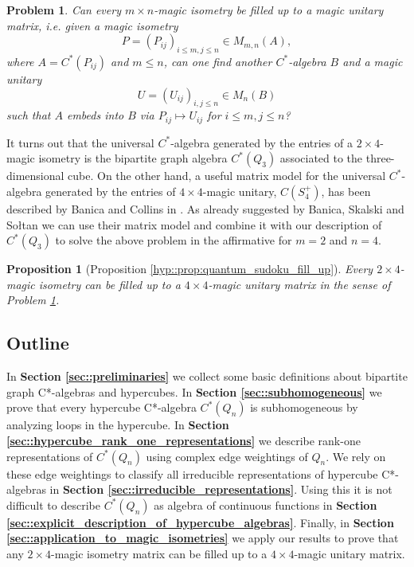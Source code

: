 \documentclass[a4paper]{amsart}
\newtheorem{problem}[thm]{Problem}
\newtheorem{introprop}[introthm]{Proposition}
\begin{document}
\begin{problem}
    \label{intro::problem:magic_isometry_fill_up}
    Can every $m \times n$-magic isometry be filled up to a magic unitary matrix, i.e. given a magic isometry 
    $$
    P = (P_{ij})_{i \leq m, j \leq n} \in M_{m,n}(A),
    $$ 
    where $A = C^\ast(P_{ij})$ and $m \leq n$, can one find another $C^\ast$-algebra $B$ and a magic unitary 
    $$
    U = (U_{ij})_{i,j \leq n} \in M_n(B)
    $$ 
    such that $A$ embeds into $B$ via $P_{ij} \mapsto U_{ij}$ for $i \leq m, j \leq n$?
\end{problem}

It turns out that the universal $C^\ast$-algebra generated by the entries of a $2 \times 4$-magic isometry is the bipartite graph algebra $C^\ast(Q_3)$ associated to the three-dimensional cube. On the other hand, a useful matrix model for the universal $C^\ast$-algebra generated by the entries of  $4 \times 4$-magic unitary, $C(S_4^+)$, has been described by Banica and Collins in \cite{banica_integration_2008}. As already suggested by Banica, Skalski and So\l tan we can use their matrix model and combine it with our description of $C^\ast(Q_3)$ to solve the above problem in the affirmative for $m=2$ and $n=4$.

\begin{introprop}[Proposition \ref{hyp::prop:quantum_sudoku_fill_up}]
    Every $2 \times 4$-magic isometry can be filled up to a $4 \times 4$-magic unitary matrix in the sense of Problem \ref{intro::problem:magic_isometry_fill_up}.
\end{introprop}

\subsection{Outline}

In \textbf{Section \ref{sec::preliminaries}} we collect some basic definitions about bipartite graph C*-algebras and hypercubes. In \textbf{Section \ref{sec::subhomogeneous}} we prove that every hypercube C*-algebra $C^\ast(Q_n)$ is subhomogeneous by analyzing loops in the hypercube. In \textbf{Section \ref{sec::hypercube_rank_one_representations}} we describe rank-one representations of $C^\ast(Q_n)$ using complex edge weightings of $Q_n$. We rely on these edge weightings to classify all irreducible representations of hypercube C*-algebras in \textbf{Section \ref{sec::irreducible_representations}}. Using this it is not difficult to describe $C^\ast(Q_n)$ as algebra of continuous functions in \textbf{Section \ref{sec::explicit_description_of_hypercube_algebras}}. Finally, in \textbf{Section \ref{sec::application_to_magic_isometries}} we apply our results to prove that any $2 \times 4$-magic isometry matrix can be filled up to a $4 \times 4$-magic unitary matrix.
\end{document}
